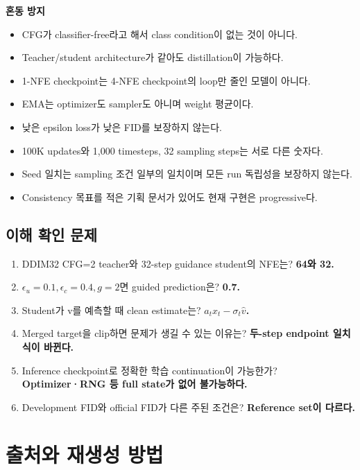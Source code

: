 \documentclass[11pt,a4paper]{article}
\begin{document}
\textbf{혼동 방지}
\begin{itemize}
\item CFG가 classifier-free라고 해서 class condition이 없는 것이 아니다.
\item Teacher/student architecture가 같아도 distillation이 가능하다.
\item 1-NFE checkpoint는 4-NFE checkpoint의 loop만 줄인 모델이 아니다.
\item EMA는 optimizer도 sampler도 아니며 weight 평균이다.
\item 낮은 epsilon loss가 낮은 FID를 보장하지 않는다.
\item 100K updates와 1,000 timesteps, 32 sampling steps는 서로 다른 숫자다.
\item Seed 일치는 sampling 조건 일부의 일치이며 모든 run 독립성을 보장하지 않는다.
\item Consistency 목표를 적은 기획 문서가 있어도 현재 구현은 progressive다.
\end{itemize}

\subsection{이해 확인 문제}
\begin{enumerate}
\item DDIM32 CFG=2 teacher와 32-step guidance student의 NFE는? \textbf{64와 32.}
\item $\epsilon_u=0.1,\epsilon_c=0.4,g=2$면 guided prediction은? \textbf{0.7.}
\item Student가 v를 예측할 때 clean estimate는? \textbf{$a_t x_t-\sigma_t\hat v$.}
\item Merged target을 clip하면 문제가 생길 수 있는 이유는? \textbf{두-step endpoint 일치 식이 바뀐다.}
\item Inference checkpoint로 정확한 학습 continuation이 가능한가? \textbf{Optimizer·RNG 등 full state가 없어 불가능하다.}
\item Development FID와 official FID가 다른 주된 조건은? \textbf{Reference set이 다르다.}
\end{enumerate}

\newpage
\section{출처와 재생성 방법}
\end{document}
